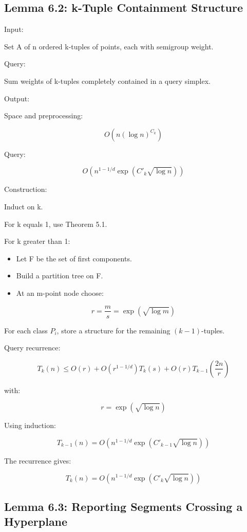 \documentclass[
  11pt,
]{article}
\providecommand{\tightlist}{%
  \setlength{\itemsep}{0pt}\setlength{\parskip}{0pt}}
\begin{document}
\hypertarget{lemma-6.2-k-tuple-containment-structure}{%
\subsection{Lemma 6.2: k-Tuple Containment
Structure}\label{lemma-6.2-k-tuple-containment-structure}}

Input:

Set A of n ordered k-tuples of points, each with semigroup weight.

Query:

Sum weights of k-tuples completely contained in a query simplex.

Output:

Space and preprocessing:

\[
O(n(\log n)^{C_k})
\]

Query:

\[
O(n^{1-1/d}\exp(C'_k\sqrt{\log n}))
\]

Construction:

Induct on k.

For k equals 1, use Theorem 5.1.

For k greater than 1:

\begin{itemize}
\tightlist
\item
  Let F be the set of first components.
\item
  Build a partition tree on F.
\item
  At an m-point node choose:
\end{itemize}

\[
r=\frac{m}{s}=\exp(\sqrt{\log m})
\]

For each class \(P_i\), store a structure for the remaining
\((k-1)\)-tuples.

Query recurrence:

\[
T_k(n) \le O(r) + O(r^{1-1/d})T_k(s) + O(r)T_{k-1}\left(\frac{2n}{r}\right)
\]

with:

\[
r=\exp(\sqrt{\log n})
\]

Using induction:

\[
T_{k-1}(n) = O(n^{1-1/d}\exp(C'_{k-1}\sqrt{\log n}))
\]

The recurrence gives:

\[
T_k(n) = O(n^{1-1/d}\exp(C'_k\sqrt{\log n}))
\]

\hypertarget{lemma-6.3-reporting-segments-crossing-a-hyperplane}{%
\subsection{Lemma 6.3: Reporting Segments Crossing a
Hyperplane}\label{lemma-6.3-reporting-segments-crossing-a-hyperplane}}
\end{document}
